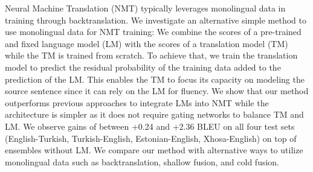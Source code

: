 Neural Machine Translation (NMT) typically leverages monolingual data in training through backtranslation. We investigate an alternative simple method to use monolingual data for NMT training: We combine the scores of a pre-trained and fixed language model (LM) with the scores of a translation model (TM) while the TM is trained from scratch. To achieve that, we train the translation model to predict the residual probability of the training data added to the prediction of the LM. This enables the TM to focus its capacity on modeling the source sentence since it can rely on the LM for fluency. We show that our method outperforms previous approaches to integrate LMs into NMT while the architecture is simpler as it does not require gating networks to balance TM and LM. We observe gains of between +0.24 and +2.36 BLEU on all four test sets (English-Turkish, Turkish-English, Estonian-English, Xhosa-English) on top of ensembles without LM. We compare our method with alternative ways to utilize monolingual data such as backtranslation, shallow fusion, and cold fusion.
